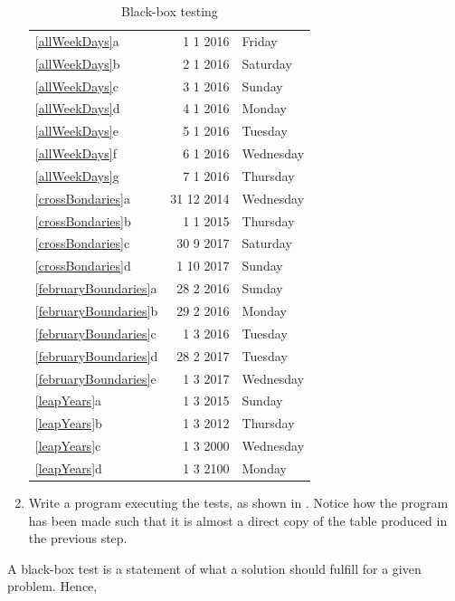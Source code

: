 \documentclass[fsharpNotes.tex]{subfiles}
\begin{document}
\begin{enumerate}
\begin{table}
\begin{center}
\begin{tabular}{|l|r|l|}
    \hline
    \ref{allWeekDays}a&1 1 2016&Friday\\
    \ref{allWeekDays}b&2 1 2016&Saturday\\
    \ref{allWeekDays}c&3 1 2016&Sunday\\
    \ref{allWeekDays}d&4 1 2016&Monday\\
    \ref{allWeekDays}e&5 1 2016&Tuesday\\
    \ref{allWeekDays}f&6 1 2016&Wednesday\\
    \ref{allWeekDays}g&7 1 2016&Thursday\\
    \hline
    \ref{crossBondaries}a&31 12 2014&Wednesday\\
    \ref{crossBondaries}b&1 1 2015&Thursday\\
    \ref{crossBondaries}c&30 9 2017&Saturday\\
    \ref{crossBondaries}d&1 10 2017&Sunday\\
    \hline
    \ref{februaryBoundaries}a&28 2 2016&Sunday\\
    \ref{februaryBoundaries}b&29 2 2016&Monday\\
    \ref{februaryBoundaries}c&1 3 2016&Tuesday\\
    \ref{februaryBoundaries}d&28 2 2017&Tuesday\\
    \ref{februaryBoundaries}e&1 3 2017&Wednesday\\
    \hline
    \ref{leapYears}a&1 3 2015&Sunday\\
    \ref{leapYears}b&1 3 2012&Thursday\\
    \ref{leapYears}c&1 3 2000&Wednesday\\
    \ref{leapYears}d&1 3 2100&Monday\\
    \hline
  \end{tabular}
\end{center}

\caption{Black-box testing}
\label{tab:blackbox}
\end{table}
\item Write a program executing the tests, as shown in .
% 
%
%
Notice how the program has been made such that it is almost a direct copy of the table produced in the previous step.
\end{enumerate}
A black-box test is a statement of what a solution should fulfill for a given problem. Hence, 
\end{document}
